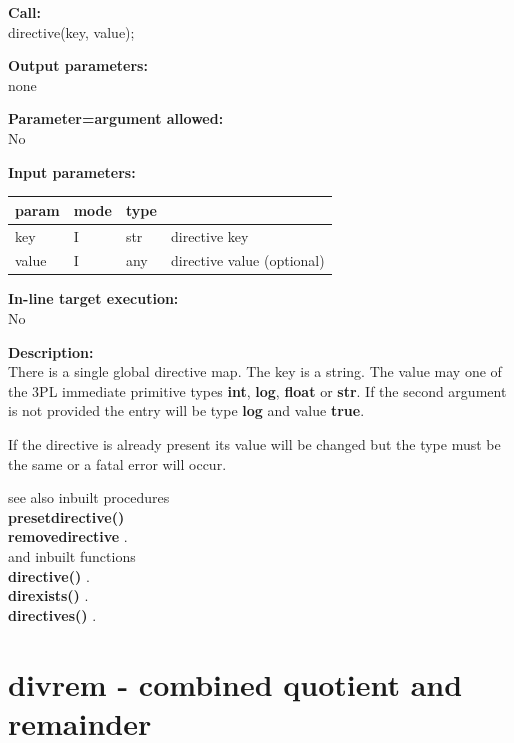         {\bf Call:} \\
        directive(key, value);
        
        {\bf Output parameters:} \\
        none
        
        {\bf Parameter=argument allowed:} \\
        No
        
        {\bf Input parameters:} \\
        \begin{tabular}{| l | l | l | l |}
        \hline
        param  & mode     & type  & \\
        \hline \hline
        key   & I & str & directive key                 \\ \hline
        value & I & any & directive value (optional)    \\ \hline
        \end{tabular}
        
        {\bf In-line target execution:} \\
        No
        
        {\bf Description:} \\
        There is a single global directive map. The key is a string.  The value
        may one of the 3PL immediate primitive types {\bf int}, {\bf log}, {\bf
        float} or {\bf str}. If the second argument is not provided the entry
        will be type {\bf log} and value {\bf true}.
        
        If the directive is already present its value will be changed but
        the type must be the same or a fatal error will occur.
               
        see also inbuilt procedures \\
        {\bf presetdirective()}  \\
        {\bf removedirective} . \\
        and inbuilt functions \\
        {\bf directive()} .\\
        {\bf direxists()} .\\
        {\bf directives()} .



    \section{divrem - combined quotient and remainder}\label{sec:ipdivrem}

